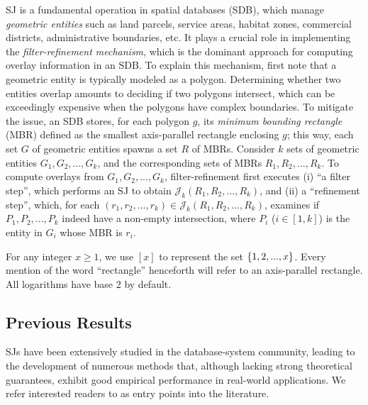 \documentclass[sigconf]{acmart}
\def\vgap{\vspace{0mm}}
\def\extraspacing{\vspace{1mm} \noindent}
\def\J{\mathcal{J}}
\begin{document}
\vgap

SJ is a fundamental operation in spatial databases (SDB), which manage {\em geometric entities} such as land parcels, service areas, habitat zones, commercial districts, administrative boundaries, etc. It plays a crucial role in implementing the {\em filter-refinement mechanism}, which is the dominant approach for computing overlay information in an SDB. To explain this mechanism, first note that a geometric entity is typically modeled as a polygon. Determining whether two entities overlap amounts to deciding if two polygons intersect, which can be exceedingly expensive when the polygons have complex boundaries. To mitigate the issue, an SDB stores, for each polygon $g$, its {\em minimum bounding rectangle} (MBR) defined as the smallest axis-parallel rectangle enclosing $g$; this way, each set $G$ of geometric entities spawns a set $R$ of MBRs. Consider $k$ sets of geometric entities $G_1, G_2, ..., G_k$, and the corresponding sets of MBRs $R_1, R_2, ..., R_k$. To compute overlays from $G_1, G_2, ..., G_k$, filter-refinement first executes (i) ``a filter step'', which performs an SJ to obtain $\J_k(R_1, R_2, ..., R_k)$, and (ii) a ``refinement step'', which, for each $(r_1, r_2, ..., r_k) \in \J_k(R_1, R_2, ..., R_k)$, examines if $P_1, P_2, ..., P_k$ indeed have a non-empty intersection, where $P_i$ ($i \in [1, k]$) is the entity in $G_i$ whose MBR is $r_i$.


\extraspacing {\bf Math Conventions.} For any integer $x \ge 1$, we use $[x]$ to represent the set $\{1, 2, ..., x\}$. Every mention of the word ``rectangle'' henceforth will refer to an axis-parallel rectangle. All logarithms have base 2 by default.

\subsection{Previous Results} \label{sec:intro:prev}

SJs have been extensively studied in the database-system community, leading to the development of numerous methods that, although lacking strong theoretical guarantees, exhibit good empirical performance in real-world applications. We refer interested readers to \cite{apr+00,bks93,gcn+13,js07,ks97,lr94,lr96,mp98,mp01,mp03,pd96,pmt99} as entry points into the literature.

\vgap
\end{document}
